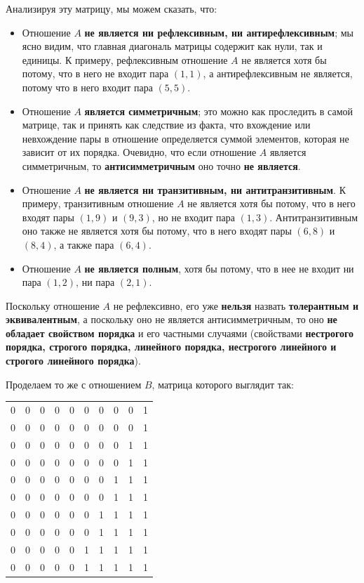 \documentclass[12pt]{article}
\begin{document}
	Анализируя эту матрицу, мы можем сказать, что:
	\begin{itemize}
		\item{Отношение $A$ {\bf не является ни рефлексивным, ни антирефлексивным}; мы ясно видим, что главная диагональ матрицы содержит как нули, так и единицы. К примеру, рефлексивным отношение $A$ не является хотя бы потому, что в него не входит пара $(1, 1)$, а антирефлексивным не является, потому что в него входит пара $(5, 5)$.}
		\item{Отношение $A$ {\bf является симметричным}; это можно как проследить в самой матрице, так и принять как следствие из факта, что вхождение или невхождение пары в отношение определяется суммой элементов, которая не зависит от их порядка. Очевидно, что если отношение $A$ является симметричным, то {\bf антисимметричным} оно точно {\bf не является}.}
		\item{Отношение $A$ {\bf не является ни транзитивным, ни антитранзитивным}. К примеру, транзитивным отношение $A$ не является хотя бы потому, что в него входят пары $(1, 9)$ и $(9, 3)$, но не входит пара $(1, 3)$. Антитранзитивным оно также не является хотя бы потому, что в него входят пары $(6, 8)$ и $(8, 4)$, а также пара $(6, 4)$.}
		\item{Отношение $A$ {\bf не является полным}, хотя бы потому, что в нее не входит ни пара $(1, 2)$, ни пара $(2, 1)$.}
	\end{itemize}
	
	Поскольку отношение $A$ не рефлексивно, его уже {\bf нельзя} назвать {\bf толерантным и эквивалентным}, а поскольку оно не является антисимметричным, то оно {\bf не обладает свойством порядка} и его частными случаями (свойствами {\bf нестрогого порядка, строгого порядка, линейного порядка, нестрогого линейного и строгого линейного порядка}).  
	\newpage
	
	Проделаем то же с отношением $B$, матрица которого выглядит так: 
	
	\begin{tabular} {c c c c c c c c c c}
		0 & 0 & 0 & 0 & 0 & 0 & 0 & 0 & 0 & 1 \\
		0 & 0 & 0 & 0 & 0 & 0 & 0 & 0 & 0 & 1 \\
		0 & 0 & 0 & 0 & 0 & 0 & 0 & 0 & 1 & 1 \\
		0 & 0 & 0 & 0 & 0 & 0 & 0 & 0 & 1 & 1 \\
		0 & 0 & 0 & 0 & 0 & 0 & 0 & 1 & 1 & 1 \\
		0 & 0 & 0 & 0 & 0 & 0 & 0 & 1 & 1 & 1 \\
		0 & 0 & 0 & 0 & 0 & 0 & 1 & 1 & 1 & 1 \\
		0 & 0 & 0 & 0 & 0 & 0 & 1 & 1 & 1 & 1 \\
		0 & 0 & 0 & 0 & 0 & 1 & 1 & 1 & 1 & 1 \\
		0 & 0 & 0 & 0 & 0 & 1 & 1 & 1 & 1 & 1 \\
	\end{tabular}
	
\end{document}
